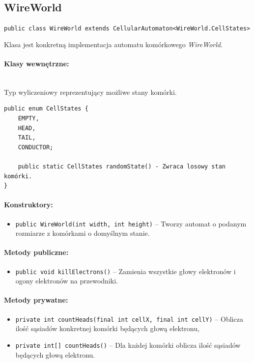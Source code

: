 \documentclass{report}
\begin{document}
\subsection{WireWorld}
\texttt{public class WireWorld extends CellularAutomaton<WireWorld.CellStates>}

Klasa jest konkretną implementacja automatu komórkowego \textit{WireWorld}.

\paragraph{Klasy wewnętrzne:} \mbox{} \\
Typ wyliczeniowy reprezentujący możliwe stany komórki.
\begin{verbatim}
public enum CellStates {
    EMPTY,
    HEAD,
    TAIL,
    CONDUCTOR;

    public static CellStates randomState() - Zwraca losowy stan komórki.
}
\end{verbatim}

\paragraph{Konstruktory:}
\begin{itemize}
	\item \texttt{public WireWorld(int width, int height)} -- Tworzy automat o podanym rozmiarze z komórkami o domyślnym stanie.
\end{itemize}

\paragraph{Metody publiczne:}
\begin{itemize}
    \item \texttt{public void killElectrons()} -- Zamienia wszystkie głowy elektronów i ogony elektronów na przewodniki.
\end{itemize}

\paragraph{Metody prywatne:}
\begin{itemize}
    \item \texttt{private int countHeads(final int cellX, final int cellY)} -- Oblicza ilość sąsiadów konkretnej komórki będących głową elektronu,
    \item \texttt{private int[] countHeads()} -- Dla każdej komórki oblicza ilość sąsiadów będących głową elektronu.
\end{itemize}
\end{document}
